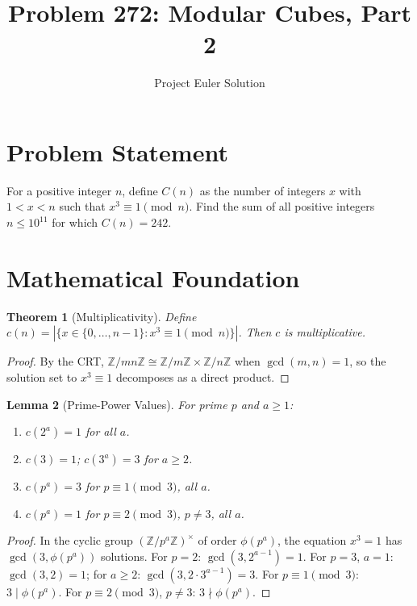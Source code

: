 \documentclass[12pt]{article}
\title{Problem 272: Modular Cubes, Part 2}
\author{Project Euler Solution}
\date{}
\newtheorem{theorem}{Theorem}
\newtheorem{lemma}[theorem]{Lemma}
\begin{document}
\maketitle

\section{Problem Statement}
For a positive integer $n$, define $C(n)$ as the number of integers $x$ with $1 < x < n$ such that $x^3 \equiv 1 \pmod{n}$. Find the sum of all positive integers $n \le 10^{11}$ for which $C(n) = 242$.

\section{Mathematical Foundation}

\begin{theorem}[Multiplicativity]
Define $c(n) = |\{x \in \{0,\ldots,n{-}1\} : x^3 \equiv 1 \pmod{n}\}|$. Then $c$ is multiplicative.
\end{theorem}

\begin{proof}
By the CRT, $\mathbb{Z}/mn\mathbb{Z} \cong \mathbb{Z}/m\mathbb{Z} \times \mathbb{Z}/n\mathbb{Z}$ when $\gcd(m,n)=1$, so the solution set to $x^3 \equiv 1$ decomposes as a direct product.
\end{proof}

\begin{lemma}[Prime-Power Values]
For prime $p$ and $a \ge 1$:
\begin{enumerate}
    \item $c(2^a) = 1$ for all $a$.
    \item $c(3) = 1$; \; $c(3^a) = 3$ for $a \ge 2$.
    \item $c(p^a) = 3$ for $p \equiv 1 \pmod{3}$, all $a$.
    \item $c(p^a) = 1$ for $p \equiv 2 \pmod{3}$, $p \neq 3$, all $a$.
\end{enumerate}
\end{lemma}

\begin{proof}
In the cyclic group $(\mathbb{Z}/p^a\mathbb{Z})^\times$ of order $\phi(p^a)$, the equation $x^3 = 1$ has $\gcd(3, \phi(p^a))$ solutions. For $p=2$: $\gcd(3, 2^{a-1})=1$. For $p=3$, $a=1$: $\gcd(3,2)=1$; for $a\ge 2$: $\gcd(3, 2\cdot 3^{a-1})=3$. For $p\equiv 1\pmod{3}$: $3\mid\phi(p^a)$. For $p\equiv 2\pmod{3}$, $p\neq 3$: $3\nmid\phi(p^a)$.
\end{proof}
\end{document}
